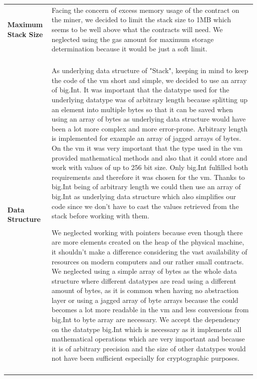\begin{tabular}[t]{ p{3cm} p{12.5cm}}
\raggedright
\textbf{Maximum Stack Size} & 
Facing the concern of excess memory usage of the contract on the miner, we decided to limit the stack size to 1MB which seems to be well above what the contracts will need. We neglected using the gas amount for maximum storage determination because it would be just a soft limit. \\ \\

\textbf{Data Structure} & 
As underlying data structure of "Stack", keeping in mind to keep the code of the vm short and simple, we decided to use an array of big.Int. It was important that the datatype used for the underlying datatype was of arbitrary length because splitting up an element into multiple bytes so that it can be saved when using an array of bytes as underlying data structure would have been a lot more complex and more error-prone. Arbitrary length is implemented for example an array of jagged arrays of bytes. On the vm it was very important that the type used in the vm provided mathematical methods and also that it could store and work with values of up to 256 bit size. Only big.Int fulfilled both requirements and therefore it was chosen for the vm. Thanks to big.Int being of arbitrary length we could then use an array of big.Int as underlying data structure which also simplifies our code since we don't have to cast the values retrieved from the stack before working with them.

We neglected working with pointers because even though there are more elements created on the heap of the physical machine, it shouldn't make a difference considering the vast availability of resources on modern computers and our rather small contracts. We neglected using a simple array of bytes as the whole data structure where different datatypes are read using a different amount of bytes, as it is common when having no abstraction layer or using a jagged array of byte arrays because the could becomes a lot more readable in the vm and less conversions from big.Int to byte array are necessary. We accept the dependency on the datatype big.Int which is necessary as it implements all mathematical operations which are very important and because it is of arbitrary precision and the size of other datatypes would not have been sufficient especially for cryptographic purposes. \\ \\
\end{tabular}

